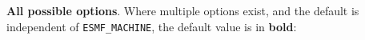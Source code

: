 \begin{longtable}{lllllll}
\end{longtable}

\vspace{1ex}

{\bf All possible options}. Where multiple options exist, and the default is independent
of {\tt ESMF\_MACHINE}, the default value is in {\bf bold}:

\vspace{1ex}


